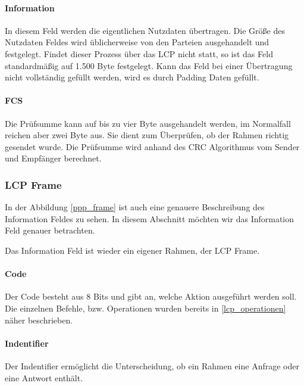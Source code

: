 \documentclass[12pt, a4paper, ngerman]{article}
\begin{document}
\paragraph{Information}

In diesem Feld werden die eigentlichen Nutzdaten übertragen. Die Größe des Nutzdaten Feldes wird üblicherweise von den Parteien ausgehandelt und festgelegt. Findet dieser Prozess über das LCP nicht statt, so ist das Feld standardmäßig auf 1.500 Byte festgelegt.
Kann das Feld bei einer Übertragung nicht voll\-stän\-dig gefüllt werden, wird es durch Padding Daten gefüllt.

\paragraph{FCS}

Die Prüfsumme kann auf bis zu vier Byte ausgehandelt werden, im Normalfall reichen aber zwei Byte aus. Sie dient zum Überprüfen, ob der Rahmen richtig gesendet wurde. Die Prüfsumme wird anhand des CRC Algorithmus vom Sender und Empfänger berechnet. 

\subsubsection{LCP Frame}
In der Abbildung \ref{ppp_frame} ist auch eine genauere Beschreibung des Information Feldes zu sehen. In diesem Abschnitt möchten wir das Information Feld genauer betrachten.

Das Information Feld ist wieder ein eigener Rahmen, der LCP Frame. 
\paragraph{Code}
Der Code besteht aus 8 Bits und gibt an, welche Aktion ausgeführt werden soll. Die einzelnen Befehle, bzw. Operationen wurden bereits in  \ref{lcp_operationen} näher beschrieben.

\paragraph{Indentifier}
Der Indentifier ermöglicht die Unterscheidung, ob ein Rahmen eine Anfrage oder eine  Antwort enthält.
\end{document}
